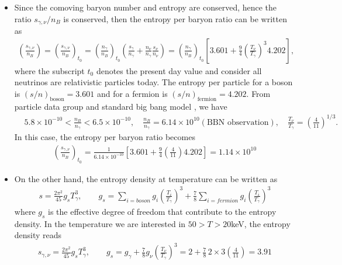 \documentclass[Universe,article,submit,moreauthors,pdftex]{Definitions/mdpi}
\begin{document}
\begin{itemize}
  \item Since the comoving baryon number and entropy are conserved, hence the ratio $s_{\gamma,\nu}/n_B$ is conserved, then the entropy per baryon ratio can be written as
\begin{align}
\left(\frac{s_{\gamma,\nu}}{n_B}\right)=\left(\frac{s_{\gamma,\nu}}{n_B}\right)_{\!\!t_0}\!\!=\left(\frac{n_\gamma}{n_B}\right)_{\!\!t_0}\left(\frac{s_\gamma}{n_\gamma}+\frac{n_\nu}{n_\gamma}\frac{s_\nu}{n_\nu}\right)=\left(\frac{n_\gamma}{n_B}\right)_{\!\!t_0}\left[3.601+\frac{9}{4}\left(\frac{T_\nu}{T_\gamma}\right)^{\!\!3}4.202\right],
\end{align}
where the subscript $t_0$ denotes the present day value and consider all neutrinos are relativistic particles today. The entropy per particle for a boson is $(s/n)_\mathrm{boson}=3.601$ and for a fermion is $(s/n)_\mathrm{fermion}=4.202$. From particle data group and standard big bang model \cite{ParticleDataGroup:2022pth,Kolb:1990vq}, we have
\begin{align}
&5.8\times10^{-10}<\frac{n_B}{n_\gamma}<6.5\times10^{-10},\quad\frac{n_B}{n_\gamma}=6.14\times10^{10}(\mathrm{BBN\,\,observation}),\quad\frac{T_\nu}{T_\gamma}=\left(\frac{4}{11}\right)^{1/3}.
\end{align}
In this case, the entropy per baryon ratio  becomes
\begin{align}
\left(\frac{s_{\gamma,\nu}}{n_B}\right)_{\!\!t_0}=\frac{1}{6.14\times10^{-10}}\left[3.601+\frac{9}{4}\left(\frac{4}{11}\right)4.202\right]=1.14\times10^{10}
\end{align}

  \item On the other hand, the entropy density at temperature can be written as \cite{Kolb:1990vq}
\begin{align}
s=\frac{2\pi^2}{45}g_sT_\gamma^3,\qquad g_s=\sum_{i=boson}g_i\left(\frac{T_i}{T_\gamma}\right)^3+\frac{7}{8}\sum_{i=fermion}g_i\left(\frac{T_i}{T_\gamma}\right)^3
\end{align}
where $g_s$ is the effective degree of freedom that contribute to the entropy density.  In the temperature we are interested in $50>T>20$keV, the entropy density reads
\begin{align}
s_{\gamma,\nu}=\frac{2\pi^2}{45}g_sT_\gamma^3,\qquad g_s=g_\gamma+\frac{7}{8}g_\nu\left(\frac{T_\nu}{T_\gamma}\right)^3=2+\frac{7}{8}\,2\times3\left(\frac{4}{11}\right)=3.91
\end{align}

\end{itemize}
\end{document}
